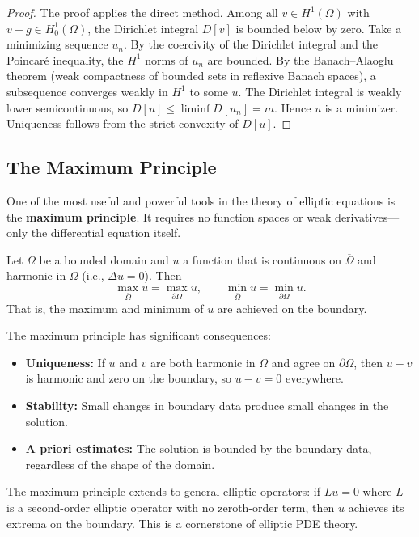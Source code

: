 \begin{proof}
The proof applies the direct method. Among all $v \in H^1(\Omega)$ with $v - g \in H^1_0(\Omega)$, the Dirichlet integral $D[v]$ is bounded below by zero. Take a minimizing sequence $u_n$. By the coercivity of the Dirichlet integral and the Poincar\'e inequality, the $H^1$ norms of $u_n$ are bounded. By the Banach--Alaoglu theorem (weak compactness of bounded sets in reflexive Banach spaces), a subsequence converges weakly in $H^1$ to some $u$. The Dirichlet integral is weakly lower semicontinuous, so $D[u] \leq \liminf D[u_n] = m$. Hence $u$ is a minimizer. Uniqueness follows from the strict convexity of $D[u]$.
\end{proof}

\subsection{The Maximum Principle}

One of the most useful and powerful tools in the theory of elliptic equations is the \textbf{maximum principle}. It requires no function spaces or weak derivatives---only the differential equation itself.

\begin{theorem}
\label{thm:max-principle}
Let $\Omega$ be a bounded domain and $u$ a function that is continuous on $\overline{\Omega}$ and harmonic in $\Omega$ (i.e., $\Delta u = 0$). Then
\[
    \max_{\overline{\Omega}} u = \max_{\partial\Omega} u, \qquad \min_{\overline{\Omega}} u = \min_{\partial\Omega} u.
\]
That is, the maximum and minimum of $u$ are achieved on the boundary.
\end{theorem}

The maximum principle has significant consequences:
\begin{itemize}
    \item \textbf{Uniqueness:} If $u$ and $v$ are both harmonic in $\Omega$ and agree on $\partial\Omega$, then $u - v$ is harmonic and zero on the boundary, so $u - v = 0$ everywhere.
    \item \textbf{Stability:} Small changes in boundary data produce small changes in the solution.
    \item \textbf{A priori estimates:} The solution is bounded by the boundary data, regardless of the shape of the domain.
\end{itemize}

The maximum principle extends to general elliptic operators: if $Lu = 0$ where $L$ is a second-order elliptic operator with no zeroth-order term, then $u$ achieves its extrema on the boundary. This is a cornerstone of elliptic PDE theory.


